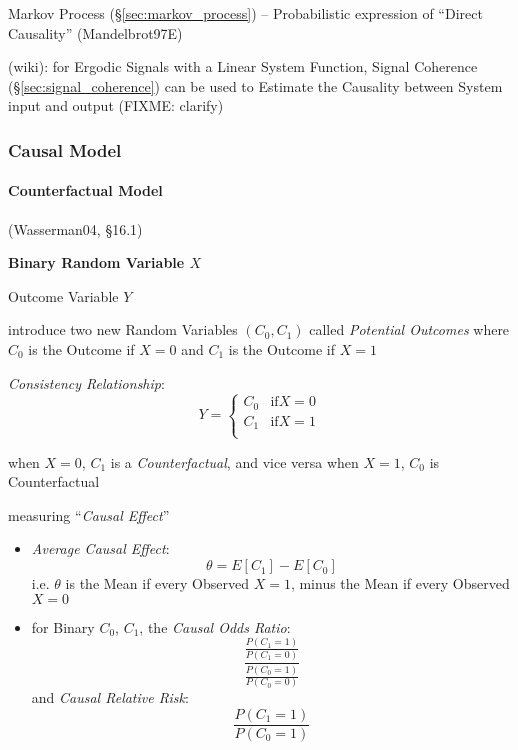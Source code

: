 Markov Process (\S\ref{sec:markov_process}) -- Probabilistic expression of
``Direct Causality'' (Mandelbrot97E)

\fist (wiki): for Ergodic Signals with a Linear System Function, Signal
Coherence (\S\ref{sec:signal_coherence}) can be used to Estimate the Causality
between System input and output (FIXME: clarify)



\subsubsection{Causal Model}\label{sec:causal_model}




\paragraph{Counterfactual Model}\label{sec:counterfactual}\hfill

(Wasserman04, \S16.1)

\textbf{Binary Random Variable $X$}

Outcome Variable $Y$

introduce two new Random Variables $(C_0, C_1)$ called \emph{Potential Outcomes}
where $C_0$ is the Outcome if $X = 0$ and $C_1$ is the Outcome if $X = 1$

\emph{Consistency Relationship}:
\[
  Y = \begin{cases}
    C_0 & \text{if} X = 0 \\
    C_1 & \text{if} X = 1 \\
  \end{cases}
\]

when $X = 0$, $C_1$ is a \emph{Counterfactual}, and vice versa when $X = 1$,
$C_0$ is Counterfactual

measuring ``\emph{Causal Effect}''

\begin{itemize}
  \item \emph{Average Causal Effect}:
    \[
      \theta = E[C_1] - E[C_0]
    \]
    i.e. $\theta$ is the Mean if every Observed $X = 1$, minus the Mean if every
    Observed $X = 0$

  \item for Binary $C_0$, $C_1$, the \emph{Causal Odds Ratio}:
    \[
      \frac{
        \frac{P(C_1 = 1)}{P(C_1 = 0)}
      }{
        \frac{P(C_0 = 1)}{P(C_0 = 0)}
      }
    \]
    and \emph{Causal Relative Risk}:
    \[
      \frac{P(C_1 = 1)}{P(C_0 = 1)}
    \]
\end{itemize}

